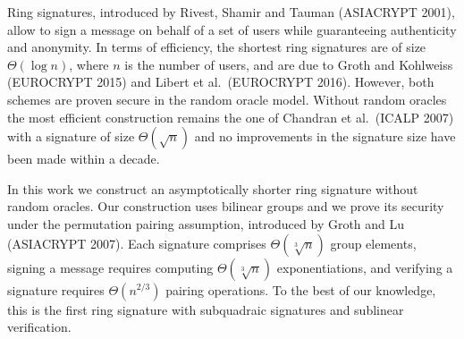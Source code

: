 
Ring signatures, introduced by Rivest, Shamir and Tauman (ASIACRYPT 2001), allow to sign a message on behalf of a set of users while guaranteeing authenticity and anonymity. In terms of efficiency, the shortest ring signatures are of size $\Theta(\log n)$, where $n$ is the number of users, and are due to Groth and Kohlweiss (EUROCRYPT 2015) and Libert et al.~(EUROCRYPT 2016). However, both schemes are proven secure in the random oracle model. Without random oracles the most efficient construction remains the one of Chandran et al.~(ICALP 2007) with a signature of size $\Theta(\sqrt{n})$ and no improvements in the signature size have been made within a decade.

In this work we construct an asymptotically shorter ring signature without random oracles. Our construction uses bilinear groups and we prove its security under the permutation pairing assumption, introduced by Groth and Lu (ASIACRYPT 2007).
 Each signature comprises $\Theta(\sqrt[3]{n})$ group elements, signing a message requires computing $\Theta(\sqrt[3]{n})$ exponentiations, and verifying a signature requires $\Theta(n^{2/3})$ pairing operations. To the best of our knowledge, this is the first ring signature with subquadraic signatures and sublinear verification.
